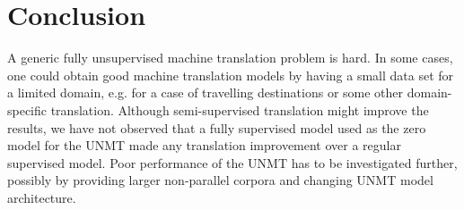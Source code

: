 \documentclass[]{article}
\begin{document}

\section{Conclusion}

A generic fully unsupervised machine translation problem is hard.
In some cases, one could obtain good machine translation models by having a small data set for a limited domain, e.g. for a case of travelling destinations or some other domain-specific translation.
Although semi-supervised translation might improve the results, we have not observed that a fully supervised model used as the zero model for the \ac{UNMT} made any translation improvement over a regular supervised model.
Poor performance of the \ac{UNMT} has to be investigated further, possibly by providing larger non-parallel corpora and changing \ac{UNMT} model architecture.

\small



\end{document}
